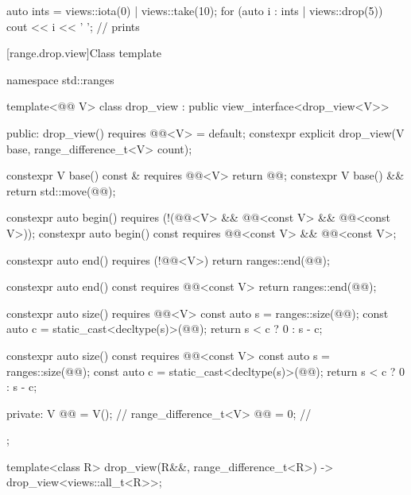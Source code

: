\pnum
\begin{example}
\begin{codeblock}
auto ints = views::iota(0) | views::take(10);
for (auto i : ints | views::drop(5)) {
  cout << i << ' ';                             // prints 
}
\end{codeblock}
\end{example}

[range.drop.view]{Class template }

%
%
%
%
\begin{codeblock}
namespace std::ranges {
  template<@@ V>
  class drop_view : public view_interface<drop_view<V>> {
  public:
    drop_view() requires @@<V> = default;
    constexpr explicit drop_view(V base, range_difference_t<V> count);

    constexpr V base() const & requires @@<V> { return @@; }
    constexpr V base() && { return std::move(@@); }

    constexpr auto begin()
      requires (!(@@<V> &&
                  @@<const V> && @@<const V>));
    constexpr auto begin() const
      requires @@<const V> && @@<const V>;

    constexpr auto end() requires (!@@<V>)
    { return ranges::end(@@); }

    constexpr auto end() const requires @@<const V>
    { return ranges::end(@@); }

    constexpr auto size() requires @@<V> {
      const auto s = ranges::size(@@);
      const auto c = static_cast<decltype(s)>(@@);
      return s < c ? 0 : s - c;
    }

    constexpr auto size() const requires @@<const V> {
      const auto s = ranges::size(@@);
      const auto c = static_cast<decltype(s)>(@@);
      return s < c ? 0 : s - c;
    }

  private:
    V @@ = V();                              // \expos
    range_difference_t<V> @@ = 0;           // \expos
  };

  template<class R>
    drop_view(R&&, range_difference_t<R>) -> drop_view<views::all_t<R>>;
}
\end{codeblock}

